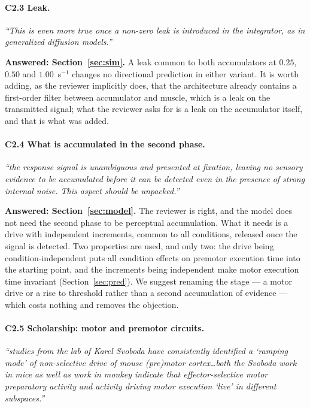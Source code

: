 \documentclass[a4paper,11pt]{article}
\newcommand{\1}{\mathbbm{1}}
\begin{document}
\paragraph{C2.3 Leak.}
\emph{``This is even more true once a non-zero leak is introduced in the integrator, as
in generalized diffusion models.''}

\textbf{Answered: Section~\ref{sec:sim}.} A leak common to both accumulators at
$0.25$, $0.50$ and $1.00$~s$^{-1}$ changes no directional prediction in either variant.
It is worth adding, as the reviewer implicitly does, that the architecture already
contains a first-order filter between accumulator and muscle, which is a leak on the
transmitted signal; what the reviewer asks for is a leak on the accumulator itself, and
that is what was added.

\paragraph{C2.4 What is accumulated in the second phase.}
\emph{``the response signal is unambiguous and presented at fixation, leaving no
sensory evidence to be accumulated before it can be detected even in the presence of
strong internal noise. This aspect should be unpacked.''}

\textbf{Answered: Section~\ref{sec:model}.} The reviewer is right, and the model does
not need the second phase to be perceptual accumulation. What it needs is a drive with
independent increments, common to all conditions, released once the signal is detected.
Two properties are used, and only two: the drive being condition-independent puts all
condition effects on premotor execution time into the starting point, and the increments
being independent make motor execution time invariant (Section~\ref{sec:pred}). We
suggest renaming the stage --- a motor drive or a rise to threshold rather than a second
accumulation of evidence --- which costs nothing and removes the objection.

\paragraph{C2.5 Scholarship: motor and premotor circuits.}
\emph{``studies from the lab of Karel Svoboda have consistently identified a `ramping
mode' of non-selective drive of mouse (pre)motor cortex\ldots both the Svoboda work in
mice as well as work in monkey indicate that effector-selective motor preparatory
activity and activity driving motor execution `live' in different subspaces.''}
\end{document}
